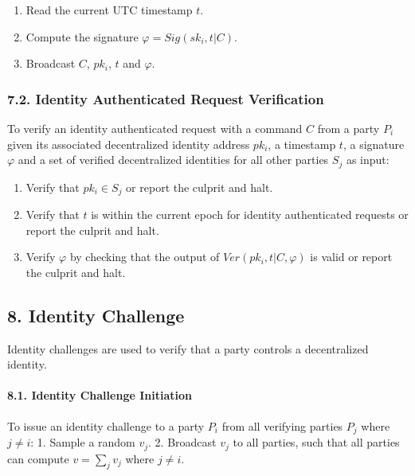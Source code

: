 \documentclass[
]{article}
\providecommand{\tightlist}{%
  \setlength{\itemsep}{0pt}\setlength{\parskip}{0pt}}
\begin{document}
\begin{enumerate}
\def\labelenumi{\arabic{enumi}.}
\tightlist
\item
  Read the current UTC timestamp \(t\).
\item
  Compute the signature \(\varphi = Sig(sk_i, t | C)\).
\item
  Broadcast \(C\), \(pk_i\), \(t\) and \(\varphi\).
\end{enumerate}

\hypertarget{identity-authed-request-verification}{%
\subsubsection{7.2. Identity Authenticated Request
Verification}\label{identity-authed-request-verification}}

To verify an identity authenticated request with a command \(C\) from a
party \(P_i\) given its associated decentralized identity address
\(pk_i\), a timestamp \(t\), a signature \(\varphi\) and a set of
verified decentralized identities for all other parties \(S_j\) as
input:

\begin{enumerate}
\def\labelenumi{\arabic{enumi}.}
\tightlist
\item
  Verify that \(pk_i \in S_j\) or report the culprit and halt.
\item
  Verify that \(t\) is within the current epoch for identity
  authenticated requests or report the culprit and halt.
\item
  Verify \(\varphi\) by checking that the output of
  \(Ver(pk_i, t | C, \varphi)\) is valid or report the culprit and halt.
\end{enumerate}

\hypertarget{identity-challenges}{%
\subsection{8. Identity Challenge}\label{identity-challenges}}

Identity challenges are used to verify that a party controls a
decentralized identity.

\hypertarget{identity-challenge-initiation}{%
\paragraph{8.1. Identity Challenge
Initiation}\label{identity-challenge-initiation}}

To issue an identity challenge to a party \(P_i\) from all verifying
parties \(P_j\) where \(j \neq i\): 1. Sample a random \(v_j\). 2.
Broadcast \(v_j\) to all parties, such that all parties can compute
\(v = \sum _j v_j\) where \(j \neq i\).
\end{document}
